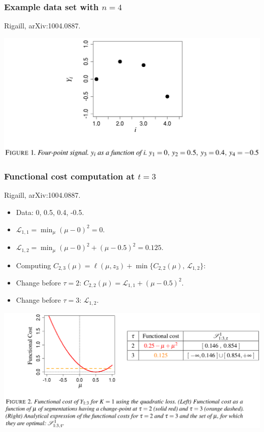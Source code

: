 \documentclass{beamer}
\begin{document}
\begin{frame}
  \frametitle{Example data set with $n=4$}
  Rigaill, arXiv:1004.0887.

  \includegraphics[width=\textwidth]{screenshot-figure-1}
\end{frame}

\begin{frame}
  \frametitle{Functional cost computation at $t=3$}
  Rigaill, arXiv:1004.0887.

  \begin{itemize}
  \item Data: 0, 0.5, 0.4, -0.5. 
  \item $\mathcal L_{1,1}=\min_\mu (\mu-0)^2=0$.
  \item $\mathcal L_{1,2}=\min_\mu (\mu-0)^2 + (\mu-0.5)^2=0.125$.
  \item Computing
    $C_{2,3}(\mu) = \ell(\mu, z_3) + \min\{C_{2,2}(\mu),\, \mathcal
    L_{1,2}\}$:
  \item Change before $\tau=2$: $C_{2,2}(\mu)=\mathcal L_{1,1} + (\mu-0.5)^2$.
  \item Change before $\tau=3$: $\mathcal L_{1,2}$.
  \end{itemize}

  \includegraphics[width=\textwidth]{screenshot-figure-2}
\end{frame}
\end{document}
